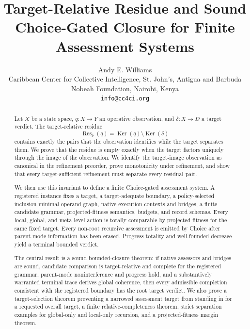 \documentclass[10pt]{article}
\title{Target-Relative Residue and Sound Choice-Gated Closure for Finite Assessment Systems}
\author{Andy E. Williams\\Caribbean Center for Collective Intelligence, St. John's, Antigua and Barbuda\\Nobeah Foundation, Nairobi, Kenya\\\texttt{info@cc4ci.org}}
\date{}
\newcommand{\Res}{\operatorname{Res}}
\newcommand{\Ker}{\operatorname{Ker}}
\begin{document}
\maketitle


\begin{abstract}
Let $X$ be a state space, $q:X\to Y$ an operative observation, and $\delta:X\to D$ a target verdict.  The target-relative residue
\[
  \Res_\delta(q)=\Ker(q)\setminus\Ker(\delta)
\]
contains exactly the pairs that the observation identifies while the target separates them.  We prove that the residue is empty exactly when the target factors uniquely through the image of the observation.  We identify the target-image observation as canonical in the refinement preorder, prove monotonicity under refinement, and show that every target-sufficient refinement must separate every residual pair.

We then use this invariant to define a finite Choice-gated assessment system.  A registered instance fixes a target, a target-adequate boundary, a policy-selected inclusion-minimal operand graph, native execution contexts and bridges, a finite candidate grammar, projected-fitness semantics, budgets, and record schemas.  Every local, global, and meta-level action is totally comparable by projected fitness for the same fixed target.  Every non-root recursive assessment is emitted by Choice after parent-mode information has been erased.  Progress totality and well-founded decrease yield a terminal bounded verdict.

The central result is a sound bounded-closure theorem: if native assessors and bridges are sound, candidate comparison is target-relative and complete for the registered grammar, parent-mode noninterference and progress hold, and a substantively warranted terminal trace derives global coherence, then every admissible completion consistent with the registered boundary has the root target verdict.  We also prove a target-selection theorem preventing a narrowed assessment target from standing in for a requested overall target, a finite relative-completeness theorem, strict separation examples for global-only and local-only recursion, and a projected-fitness margin theorem.


\end{abstract}
\end{document}
